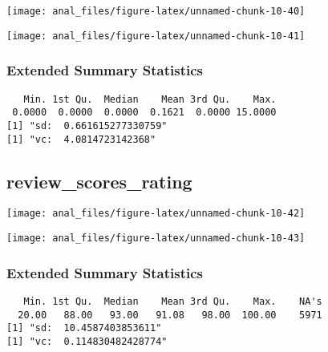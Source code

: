 \begin{center}\texttt{[image: anal\_files/figure-latex/unnamed-chunk-10-40]} \end{center}

\begin{center}\texttt{[image: anal\_files/figure-latex/unnamed-chunk-10-41]} \end{center}

\hypertarget{extended-summary-statistics-13}{%
\subsubsection{Extended Summary
Statistics}\label{extended-summary-statistics-13}}

\begin{verbatim}   Min. 1st Qu.  Median    Mean 3rd Qu.    Max. 
 0.0000  0.0000  0.0000  0.1621  0.0000 15.0000 
[1] "sd:  0.661615277330759"
[1] "vc:  4.0814723142368"
\end{verbatim}

\pagebreak

\centering

\hypertarget{review_scores_rating}{%
\subsection{review\_scores\_rating}\label{review_scores_rating}}

\begin{center}\texttt{[image: anal\_files/figure-latex/unnamed-chunk-10-42]} \end{center}

\begin{center}\texttt{[image: anal\_files/figure-latex/unnamed-chunk-10-43]} \end{center}

\hypertarget{extended-summary-statistics-14}{%
\subsubsection{Extended Summary
Statistics}\label{extended-summary-statistics-14}}

\begin{verbatim}   Min. 1st Qu.  Median    Mean 3rd Qu.    Max.    NA's 
  20.00   88.00   93.00   91.08   98.00  100.00    5971 
[1] "sd:  10.4587403853611"
[1] "vc:  0.114830482428774"
\end{verbatim}

